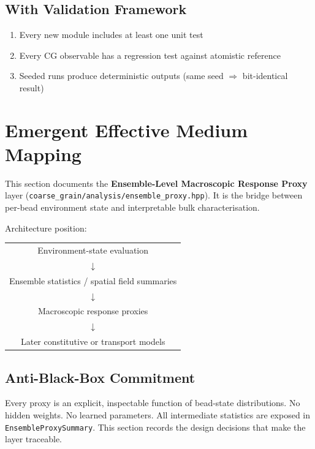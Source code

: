 \documentclass[11pt]{article}
\newcommand{\file}[1]{\texttt{#1}}
\newcommand{\type}[1]{\texttt{#1}}
\begin{document}
\subsection{With Validation Framework}

\begin{enumerate}
  \item Every new module includes at least one unit test
  \item Every CG observable has a regression test against atomistic reference
  \item Seeded runs produce deterministic outputs (same seed $\Rightarrow$
        bit-identical result)
\end{enumerate}

\section{Emergent Effective Medium Mapping}
\label{sec:ensemble_proxy}

This section documents the \textbf{Ensemble-Level Macroscopic Response Proxy}
layer (\file{coarse\_grain/analysis/ensemble\_proxy.hpp}).  It is the bridge
between per-bead environment state and interpretable bulk characterisation.

Architecture position:
\begin{center}
\begin{tabular}{c}
Environment-state evaluation \\
$\downarrow$ \\
Ensemble statistics / spatial field summaries \\
$\downarrow$ \\
Macroscopic response proxies \\
$\downarrow$ \\
Later constitutive or transport models
\end{tabular}
\end{center}

\subsection{Anti-Black-Box Commitment}

Every proxy is an explicit, inspectable function of bead-state distributions.
No hidden weights.  No learned parameters.  All intermediate statistics are
exposed in \type{EnsembleProxySummary}.  This section records the design
decisions that make the layer traceable.
\end{document}
